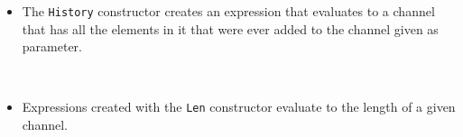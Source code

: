 \begin{itemize}
\begin{itemize}
        \item The \verb|History| constructor creates an expression that evaluates to a channel that has all the elements in it that were ever added to the channel given as parameter.
        \begin{code}
            \>[4]\AgdaSpace{}%
            \AgdaSymbol{:}\AgdaSpace{}%
            \AgdaSymbol{\{}\AgdaSpace{}%
            \AgdaSymbol{:}\AgdaSpace{}%
            \AgdaSymbol{\}}\AgdaSpace{}%
            \<%
            \\
            \>[4][@{}l@{\AgdaIndent{0}}]%
            \>[6]\AgdaSpace{}%
            \AgdaSymbol{(}\AgdaSpace{}%
            \AgdaSymbol{)}\AgdaSpace{}%
            \AgdaSpace{}%
            \AgdaSpace{}%
            \AgdaSymbol{(}\AgdaSpace{}%
            \AgdaSymbol{)}\<%
        \end{code}
        
        \item Expressions created with the \verb|Len| constructor evaluate to the length of a given channel.
        \begin{code}
            \>[4]\AgdaSpace{}%
            \AgdaSymbol{:}\AgdaSpace{}%
            \AgdaSymbol{\{}\AgdaSpace{}%
            \AgdaSymbol{:}\AgdaSpace{}%
            \AgdaSymbol{\}}\AgdaSpace{}%
            \AgdaSpace{}%
            \AgdaSpace{}%
            \AgdaSymbol{(}\AgdaSpace{}%
            \AgdaSymbol{)}\AgdaSpace{}%
            \AgdaSpace{}%
            \AgdaSpace{}%
            \AgdaSymbol{(}\AgdaSymbol{)}\<%
        \end{code}
        

\end{itemize}
\end{itemize}
